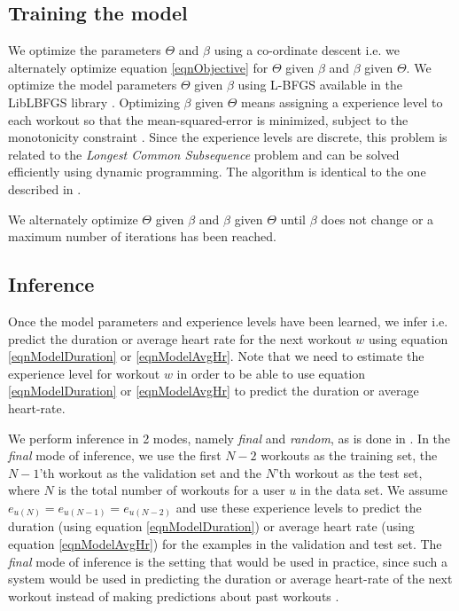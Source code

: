 \documentclass{acm_proc_article-sp}
\begin{document}
\subsection{Training the model}
We optimize the parameters $\Theta$ and $\beta$ using a co-ordinate descent \cite{coordinateDescentWiki} i.e. we alternately optimize equation \ref{eqnObjective} for $\Theta$ given $\beta$ and $\beta$ given $\Theta$. We optimize the model parameters $\Theta$ given $\beta$ using L-BFGS \cite{lbfgs} available in the LibLBFGS library \cite{liblbfgs}. Optimizing $\beta$ given $\Theta$ means assigning a experience level to each workout so that the mean-squared-error is minimized, subject to the monotonicity constraint \cite{www13}. Since the experience levels are discrete, this problem is related to the \emph{Longest Common Subsequence} problem \cite{lcs} and can be solved efficiently using dynamic programming. The algorithm is identical to the one described in \cite{www13}.

We alternately optimize $\Theta$ given $\beta$ and $\beta$ given $\Theta$ until $\beta$ does not change or a maximum number of iterations has been reached.

\subsection{Inference}
Once the model parameters and experience levels have been learned, we infer i.e. predict the duration or average heart rate for the next workout $w$ using equation \ref{eqnModelDuration} or \ref{eqnModelAvgHr}. Note that we need to estimate the experience level for workout $w$ in order to be able to use equation \ref{eqnModelDuration} or \ref{eqnModelAvgHr} to predict the duration or average heart-rate. 

We perform inference in 2 modes, namely \emph{final} and \emph{random}, as is done in \cite{www13}. In the \emph{final} mode of inference, we use the first $N-2$ workouts as the training set, the $N-1$'th workout as the validation set and the $N$'th workout as the test set, where $N$ is the total number of workouts for a user $u$ in the data set. We assume $e_{u(N)} = e_{u(N-1)} = e_{u(N-2)}$ and use these experience levels to predict the duration (using equation \ref{eqnModelDuration}) or average heart rate (using equation \ref{eqnModelAvgHr}) for the examples in the validation and test set. The \emph{final} mode of inference is the setting that would be used in practice, since such a system would be used in predicting the duration or average heart-rate of the next workout instead of making predictions about past workouts \cite{www13}.
\end{document}
